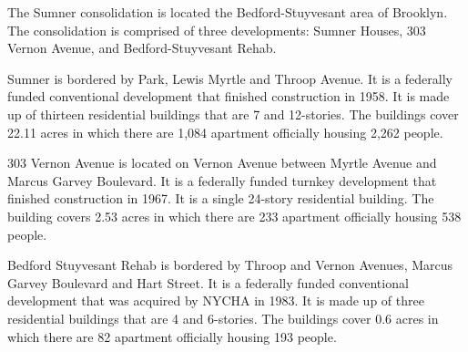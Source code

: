 The Sumner consolidation is located the Bedford-Stuyvesant area of Brooklyn. The consolidation is comprised of three developments: Sumner Houses, 303 Vernon Avenue, and Bedford-Stuyvesant Rehab. \par \vspace{.7\baselineskip}Sumner is bordered by Park, Lewis Myrtle and Throop Avenue. It is a federally funded conventional development that finished construction in 1958. It is made up of thirteen residential buildings that are 7 and 12-stories. The buildings cover 22.11 acres in which there are 1,084 apartment officially housing 2,262 people. \par \vspace{.7\baselineskip}303 Vernon Avenue is located on Vernon Avenue between Myrtle Avenue and Marcus Garvey Boulevard. It is a federally funded turnkey development that finished construction in 1967. It is a single 24-story residential building. The building covers 2.53 acres in which there are 233 apartment officially housing 538 people. \par \vspace{.7\baselineskip}Bedford Stuyvesant Rehab is bordered by Throop and Vernon Avenues, Marcus Garvey Boulevard and Hart Street. It is a federally funded conventional development that was acquired by NYCHA in 1983. It is made up of three residential buildings that are 4 and 6-stories. The buildings cover 0.6 acres in which there are 82 apartment officially housing 193 people.